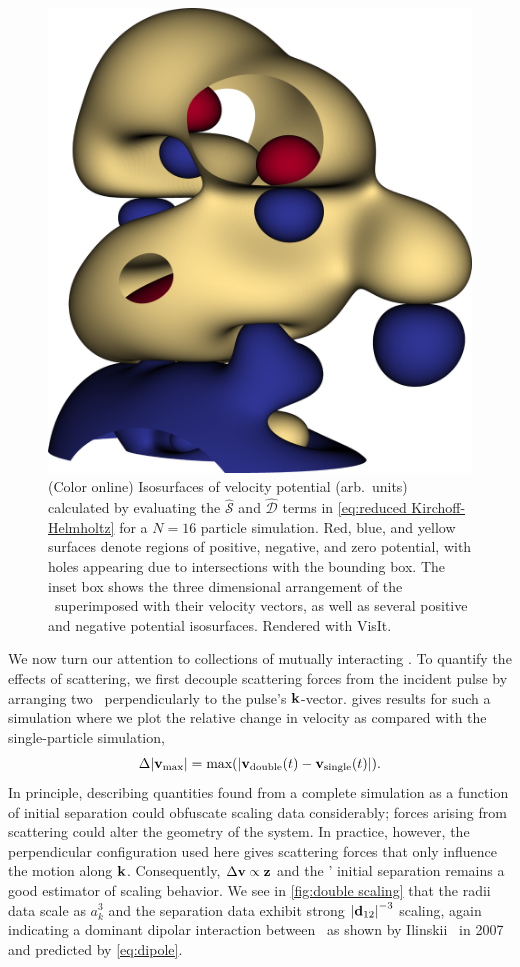 \begin{figure}
  \centering
  \includegraphics[width=0.5\columnwidth]{figures/3d_isosurface.png}
  \caption{
    \label{fig:isosurface}(Color online) 
    Isosurfaces of velocity potential (arb.~units) calculated by evaluating the $\hat{\mathcal{S}}$ and $\hat{\mathcal{D}}$ terms in \cref{eq:reduced Kirchoff-Helmholtz} for a $N = 16$ particle simulation.
    Red, blue, and yellow surfaces denote regions of positive, negative, and zero potential, with holes appearing due to intersections with the bounding box.
    The inset box shows the three dimensional arrangement of the \bubbles\ superimposed with their velocity vectors, as well as several positive and negative potential isosurfaces.
    Rendered with VisIt\cite{VisIt}.
  }
\end{figure}
We now turn our attention to collections of mutually interacting \bubbles.
To quantify the effects of scattering, we first decouple scattering forces from the incident pulse by arranging two \bubbles\ perpendicularly to the pulse's $\vb{k}$-vector.
 gives results for such a simulation where we plot the relative change in velocity as compared with the single-particle simulation,
\begin{equation}
  \Delta \abs{\vb{v}_\text{max}} = \text{max}\qty(\abs{\vb{v}_\text{double}(t) - \vb{v}_\text{single}(t)}).
\end{equation}
In principle, describing quantities found from a complete simulation as a function of initial separation could obfuscate scaling data considerably; forces arising from scattering could alter the geometry of the system.
In practice, however, the perpendicular configuration used here gives scattering forces that only influence the motion along $\vb{k}$.
Consequently, $\Delta\vb{v} \propto \vb{z}$ and the \bubbles' initial separation remains a good estimator of scaling behavior. 
We see in \cref{fig:double scaling} that the radii data scale as $a_k^3$ and the
separation data exhibit strong $\abs{\vb{d}_{12}}^{-3}$ scaling, again
indicating a dominant dipolar interaction between \bubbles\ as shown by Ilinskii \etal\ in 2007~\cite{Ilinskii2007} and predicted by \cref{eq:dipole}.

